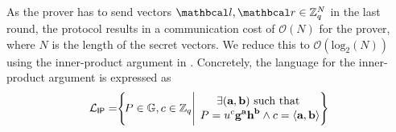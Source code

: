   
  
  
  \vspace{1cm}
  
  As the prover has to send vectors $\lvec, \rvec \in \Z_q^N$ in the last round, the \proto protocol results in a communication cost of $\mathcal{O}(N)$ for the prover, where $N$ is the length of the secret vectors.
  We reduce this to $\mathcal{O}(\text{log}_2(N))$ using the inner-product argument in \cite{Bunz2018}. Concretely, the language for the inner-product argument is expressed as 
  \begin{equation}
    \L_{\textsf{IP}} = \hspace{-1mm}
    \left\{ 
    \hspace{-0.5mm}  
    P \in \G, c \in \Z_q \Bigg| 
    \text{
    \hspace{-3mm}
    \begin{tabular}{c}
    $\exists (\textbf{a}, \textbf{b}) \text{ such that }$
    \\ 
    $P = u^{c}\textbf{g}^{\textbf{a}} \textbf{h}^{\textbf{b}} \wedge c = \langle \textbf{a}, \textbf{b} \rangle$
    \end{tabular}
    \hspace{-3mm}
    }
    \hspace{-1.5mm}
    \right\}
    \label{eqnIPALanguage}
  \end{equation}
  
  
